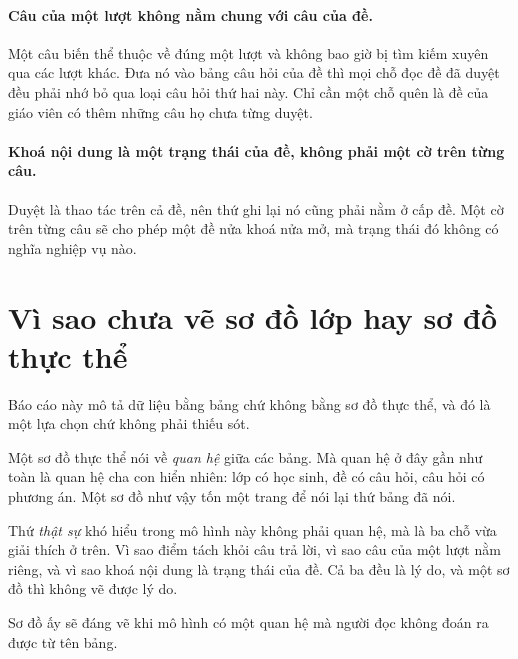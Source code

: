 \paragraph{Câu của một lượt không nằm chung với câu của đề.} Một câu biến thể thuộc về đúng một
lượt và không bao giờ bị tìm kiếm xuyên qua các lượt khác. Đưa nó vào bảng câu hỏi của đề
thì mọi chỗ đọc đề đã duyệt đều phải nhớ bỏ qua loại câu hỏi thứ hai này. Chỉ cần một chỗ
quên là đề của giáo viên có thêm những câu họ chưa từng duyệt.

\paragraph{Khoá nội dung là một trạng thái của đề, không phải một cờ trên từng câu.} Duyệt là
thao tác trên cả đề, nên thứ ghi lại nó cũng phải nằm ở cấp đề. Một cờ trên từng câu sẽ cho phép
một đề nửa khoá nửa mở, mà trạng thái đó không có nghĩa nghiệp vụ nào.

\section{Vì sao chưa vẽ sơ đồ lớp hay sơ đồ thực thể}

Báo cáo này mô tả dữ liệu bằng bảng chứ không bằng sơ đồ thực thể, và đó là một lựa chọn chứ
không phải thiếu sót.

Một sơ đồ thực thể nói về \emph{quan hệ} giữa các bảng. Mà quan hệ ở đây gần như toàn là
quan hệ cha con hiển nhiên: lớp có học sinh, đề có câu hỏi, câu hỏi có phương án. Một sơ đồ
như vậy tốn một trang để nói lại thứ bảng đã nói.

Thứ \emph{thật sự} khó hiểu trong mô hình này không phải quan hệ, mà là ba chỗ vừa giải thích ở
trên. Vì sao điểm tách khỏi câu trả lời, vì sao câu của một lượt nằm riêng, và vì sao khoá nội
dung là trạng thái của đề. Cả ba đều là lý do, và một sơ đồ thì không vẽ được lý do.

Sơ đồ ấy sẽ đáng vẽ khi mô hình có một quan hệ mà người đọc không đoán ra được từ tên bảng.
